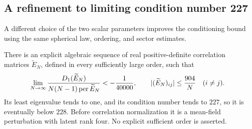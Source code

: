
\subsection{A refinement to limiting condition number 227}
\label{rf:subsection}

A different choice of the two scalar parameters improves the conditioning
bound using the same spherical law, ordering, and sector estimates.

\begin{theorem}
\label{rf:228}
There is an explicit algebraic sequence of real positive-definite
correlation matrices \(\widetilde E_N\), defined in every sufficiently
large order, such that
\[
 \lim_{N\to\infty}
 \frac{D_1(\widetilde E_N)}{N(N-1)\operatorname{per}\widetilde E_N}
 <-\frac1{40000},\qquad
 |(\widetilde E_N)_{ij}|\le\frac{904}{N}\quad(i\ne j).
\]
Its least eigenvalue tends to one, and its condition number tends to
\(227\), so it is eventually below \(228\). Before correlation
normalization it is a mean-field perturbation with latent rank four.
No explicit sufficient order is asserted.
\end{theorem}

